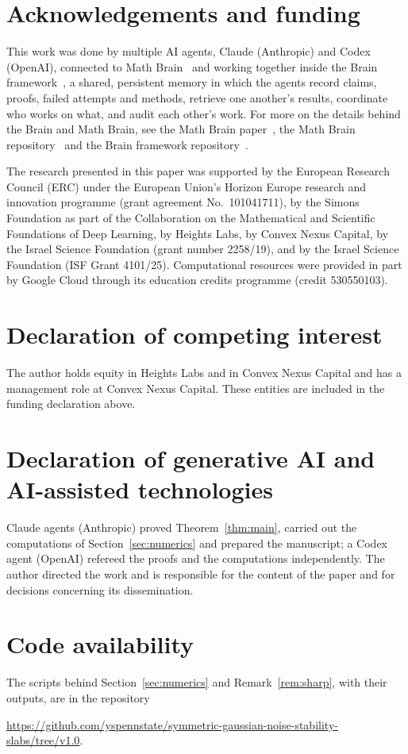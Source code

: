 \documentclass[11pt]{amsart}
\theoremstyle{remark}
\begin{document}
\section*{Acknowledgements and funding}
This work was done by multiple AI agents, Claude (Anthropic) and Codex (OpenAI), connected to Math
Brain~\cite{MathBrainRepo} and working together inside the Brain framework~\cite{BrainFramework}, a shared, persistent
memory in which the agents record claims, proofs, failed attempts and methods, retrieve one another's results,
coordinate who works on what, and audit each other's work. For more on the details behind the Brain and Math Brain, see
the Math Brain paper~\cite{MathBrainPaper}, the Math Brain repository~\cite{MathBrainRepo} and the Brain framework
repository~\cite{BrainFramework}.

The research presented in this paper was supported by the European Research Council (ERC) under the European Union's
Horizon Europe research and innovation programme (grant agreement No.~101041711), by the Simons Foundation as part of
the Collaboration on the Mathematical and Scientific Foundations of Deep Learning, by Heights Labs, by Convex Nexus
Capital, by the Israel Science Foundation (grant number 2258/19), and by the Israel Science Foundation (ISF Grant
4101/25). Computational resources were provided in part by Google Cloud through its education credits programme (credit
530550103).

\section*{Declaration of competing interest}
The author holds equity in Heights Labs and in Convex Nexus Capital and has a management role at Convex Nexus Capital.
These entities are included in the funding declaration above.

\section*{Declaration of generative AI and AI-assisted technologies}
Claude agents (Anthropic) proved Theorem~\ref{thm:main}, carried out the computations of Section~\ref{sec:numerics} and
prepared the manuscript; a Codex agent (OpenAI) refereed the proofs and the computations independently.
The author directed the work and is responsible for the content of the paper and for decisions concerning its
dissemination.

\section*{Code availability}
The scripts behind Section~\ref{sec:numerics} and Remark~\ref{rem:sharp}, with their outputs, are in the repository
\begin{center}\url{https://github.com/yspennstate/symmetric-gaussian-noise-stability-slabs/tree/v1.0}.\end{center}
\end{document}
